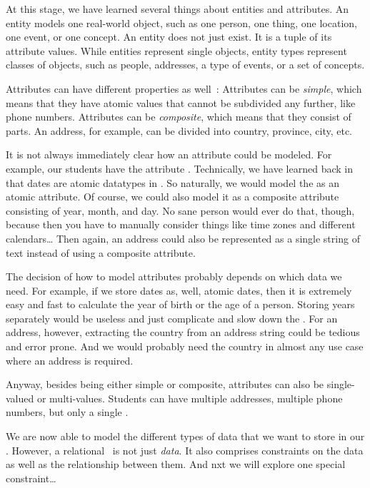 At this stage, we have learned several things about entities and attributes.
An entity models one real-world object, such as one person, one thing, one location, one event, or one concept.
An entity does not just exist.
It is a tuple of its attribute values.
While entities represent single objects, entity types represent classes of objects, such as people, addresses, a type of events, or a set of concepts.

Attributes can have different properties as well~\cite{S2024D:CDMERDE}:
Attributes can be \emph{simple}, which means that they have atomic values that cannot be subdivided any further, like phone numbers.
Attributes can be \emph{composite}, which means that they consist of parts.
An address, for example, can be divided into country, province, city, etc.

It is not always immediately clear how an attribute could be modeled.
For example, our students have the attribute \emph{}.
Technically, we have learned back in  that dates are atomic datatypes in \sql.
So naturally, we would model the  as an atomic attribute.
Of course, we could also model it as a composite attribute consisting of year, month, and day.
No sane person would ever do that, though, because then you have to manually consider things like time zones and different calendars{\dots}
Then again, an address could also be represented as a single string of text instead of using a composite attribute.

The decision of how to model attributes probably depends on which data we need.
For example, if we store dates as, well, atomic dates, then it is extremely easy and fast to calculate the year of birth or the age of a person.
Storing years separately would be useless and just complicate and slow down the \db.
For an address, however, extracting the country from an address string could be tedious and error prone.
And we would probably need the country in almost any use case where an address is required.

Anyway, besides being either simple or composite, attributes can also be single-valued or multi-values.
Students can have multiple addresses, multiple phone numbers, but only a single .

We are now able to model the different types of data that we want to store in our \db.
However, a relational \db\ is not just \emph{data}.
It also comprises constraints on the data as well as the relationship between them.
And nxt we will explore one special constraint\dots%
\FloatBarrier%
\endhsection%
%
